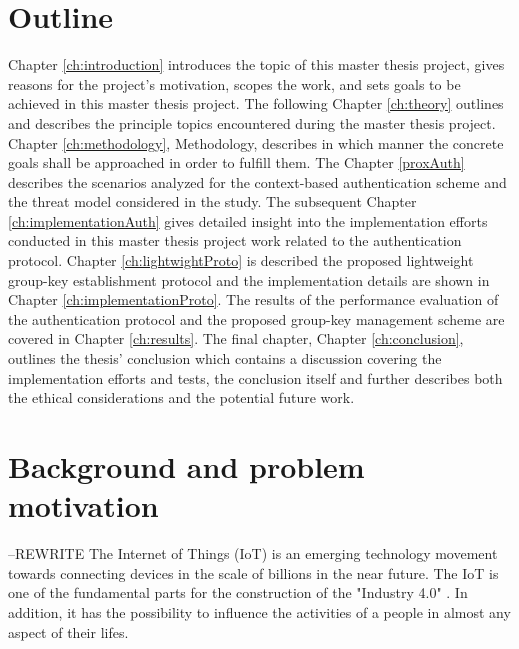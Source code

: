 \section{Outline}
\label{ch:disposition}
Chapter \ref{ch:introduction} introduces the topic of this master thesis project, gives reasons for the project's motivation, scopes the work, and sets goals to be achieved in this master thesis project. The following Chapter \ref{ch:theory} outlines and describes the principle topics encountered during the master thesis project. Chapter \ref{ch:methodology}, Methodology, describes in which manner the concrete goals shall be approached in order to fulfill them. The Chapter \ref{proxAuth} describes the scenarios analyzed for the context-based authentication scheme and the threat model considered in the study. The subsequent Chapter \ref{ch:implementationAuth} gives detailed insight into the implementation efforts conducted in this master thesis project work related to the authentication protocol. Chapter \ref{ch:lightwightProto} is described the proposed lightweight group-key establishment protocol and the implementation details are shown in Chapter \ref{ch:implementationProto}. The results of the performance evaluation of the authentication protocol and the proposed group-key management scheme are covered in Chapter \ref{ch:results}. The final chapter, Chapter \ref{ch:conclusion}, outlines the thesis' conclusion which contains a discussion covering the implementation efforts and tests, the conclusion itself and further describes both the ethical considerations and the potential future work. 




\iffalse


\section{Background and problem motivation}
\label{sec:background}

--REWRITE
The Internet of Things (IoT) is an emerging technology movement towards connecting devices in the scale of billions in the near future\cite{Evans2011}. The IoT is one of the fundamental parts for the construction of the "Industry 4.0" \cite{Shrouf2014}. In addition, it has the possibility to influence the activities of a people in almost any aspect of their lifes\cite{Atzori2010}. 

